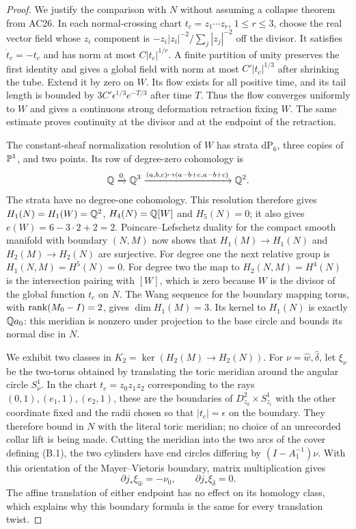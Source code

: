 \begin{proof}
We justify the comparison with $N$ without assuming a collapse
theorem from AC26. In each normal-crossing chart
$t_c=z_1\cdots z_r$, $1\le r\le3$, choose the real vector field
whose $z_i$ component is
$-z_i|z_i|^{-2}/\sum_j|z_j|^{-2}$ off the divisor.
It satisfies $\dot t_c=-t_c$ and has norm at most
$C|t_c|^{1/r}$. A finite partition of unity preserves the first
identity and gives a global field with norm at most
$C'|t_c|^{1/3}$ after shrinking the tube. Extend it by zero on $W$.
Its flow exists for all positive time, and its tail length is
bounded by $3C'\epsilon^{1/3}e^{-T/3}$ after time $T$.
Thus the flow converges uniformly to $W$ and gives a continuous
strong deformation retraction fixing $W$. The same estimate proves
continuity at the divisor and at the endpoint of the retraction.

The constant-sheaf normalization resolution of $W$ has strata
$\mathrm{dP}_6$, three copies of $\mathbb P^1$, and two points.
Its row of degree-zero cohomology is
\[
 \mathbb Q\xrightarrow{0}\mathbb Q^3
 \xrightarrow{(a,b,c)\mapsto(a-b+c,a-b+c)}\mathbb Q^2.
\]
The strata have no degree-one cohomology. This resolution therefore
gives $H_1(N)=H_1(W)=\mathbb Q^2$, $H_4(N)=\mathbb Q[W]$ and $H_5(N)=0$;
it also gives $e(W)=6-3\cdot2+2=2$.
Poincare--Lefschetz duality for the compact smooth manifold with
boundary $(N,M)$ now shows that $H_1(M)\to H_1(N)$ and
$H_2(M)\to H_2(N)$ are surjective. For degree one the next
relative group is $H_1(N,M)=H^5(N)=0$.
For degree two the map to $H_2(N,M)=H^4(N)$ is the intersection
pairing with $[W]$, which is zero because $W$ is the divisor of
the global function $t_c$ on $N$. The Wang sequence for the
boundary mapping torus, with $\operatorname{rank}(M_0-I)=2$, gives
$\dim H_1(M)=3$. Its kernel to $H_1(N)$ is exactly
$\mathbb Q a_0$: this meridian is nonzero under projection to the base
circle and bounds its normal disc in $N$.

We exhibit two classes in
$K_2=\ker(H_2(M)\to H_2(N))$.
For $\nu=\hat w,\hat\delta$, let $\xi_\nu$ be the two-torus
obtained by translating the toric meridian around the angular
circle $S^1_\nu$. In the chart $t_c=z_0z_1z_2$ corresponding to
the rays $(0,1),(e_1,1),(e_2,1)$, these are the boundaries of
$D^2_{z_0}\times S^1_{z_i}$ with the other coordinate fixed
and the radii chosen so that $|t_c|=\epsilon$ on the boundary.
They therefore bound in $N$ with the literal toric meridian;
no choice of an unrecorded collar lift is being made.
Cutting the meridian into the two arcs of the cover defining
(B.1), the two cylinders have end circles differing by
$(I-A_1^{-1})\nu$. With this orientation of the Mayer--Vietoris
boundary, matrix multiplication gives
\[
 \partial j_*\xi_{\hat w}=-\nu_0,\qquad
 \partial j_*\xi_{\hat\delta}=0.                       \tag{B.3}
\]
The affine translation of either endpoint has no effect on its
homology class, which explains why this boundary formula is the
same for every translation twist.


\end{proof}
